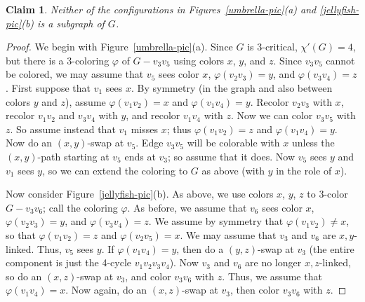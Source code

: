 \documentclass[12pt]{article}
\theoremstyle{plain}
\newtheorem{clm}{Claim}
\theoremstyle{definition}
\theoremstyle{remark}
\begin{document}
\begin{clm}
Neither of the configurations in Figures~\ref{umbrella-pic}(a) and
\ref{jellyfish-pic}(b) is a subgraph of $G$.
\label{clm2}
\end{clm}
\begin{proof}
We begin with Figure~\ref{umbrella-pic}(a).  
Since $G$ is 3-critical, $\chi'(G)=4$, but there is a 3-coloring $\varphi$ of
$G-v_3v_5$ using colors $x$, $y$, and $z$.  Since $v_3v_5$ cannot be colored,
we may assume that $v_5$ sees color $x$, $\varphi(v_2v_3)=y$, and
$\varphi(v_3v_4)=z$.  First suppose that $v_1$ sees $x$.  By symmetry (in the
graph and also between colors $y$ and $z$), assume $\varphi(v_1v_2)=x$ and
$\varphi(v_1v_4)=y$. Recolor $v_2v_3$ with $x$, recolor $v_1v_2$ and $v_3v_4$ with
$y$, and recolor $v_1v_4$ with $z$.  Now we can color $v_3v_5$ with $z$.  So
assume instead that $v_1$ misses $x$; thus $\varphi(v_1v_2)=z$ and
$\varphi(v_1v_4)=y$.  Now do an $(x,y)$-swap at $v_5$.  Edge $v_3v_5$
will be colorable with $x$ unless the $(x,y)$-path starting at $v_5$ ends
at $v_3$; so assume that it does.  Now $v_5$ sees $y$ and $v_1$ sees $y$, so we
can extend the coloring to $G$ as above (with $y$ in the role of $x$).

Now consider Figure~\ref{jellyfish-pic}(b).  As above, we use colors $x$, $y$, $z$
to 3-color $G-v_3v_6$; call the coloring $\varphi$.  
As before, we assume that $v_6$ sees color $x$, $\varphi(v_2v_3)=y$, and
$\varphi(v_3v_4)=z$.  We assume by symmetry that $\varphi(v_1v_2)\ne x$, so
that $\varphi(v_1v_2)=z$ and $\varphi(v_2v_5)=x$.
We may
assume that $v_3$ and $v_6$ are $x,y$-linked.  Thus, $v_5$ sees $y$.  If
$\varphi(v_1v_4)=y$, then do a $(y,z)$-swap at $v_3$ (the entire component is
just the 4-cycle $v_1v_2v_3v_4$).  Now $v_3$ and $v_6$
are no longer $x,z$-linked, so do an $(x,z)$-swap at $v_3$, and color
$v_3v_6$ with $z$.  Thus, we assume that $\varphi(v_1v_4)=x$.  Now again, do an
$(x,z)$-swap at $v_3$, then color $v_3v_6$ with $z$.
\end{proof}
\end{document}
